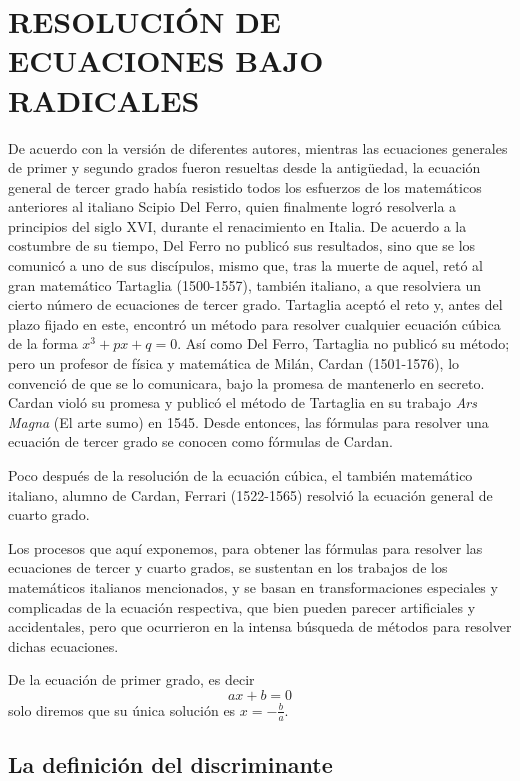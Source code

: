 \chapter[RESOLUCIÓN DE ECUACIONES BAJO RADICALES]{RESOLUCIÓN DE \\ ECUACIONES BAJO \\ RADICALES}\label{sec:radical}

De acuerdo con la versión de diferentes autores, mientras las ecuaciones generales de primer y segundo grados fueron resueltas desde la antigüedad, la ecuación general de tercer grado había resistido todos los esfuerzos de los matemáticos anteriores al italiano Scipio Del Ferro, quien finalmente logró resolverla a principios del siglo XVI, durante el renacimiento en Italia. De acuerdo a la costumbre de su tiempo, Del Ferro no publicó sus resultados, sino que se los comunicó a uno de sus discípulos, mismo que, tras la muerte de aquel, retó al gran matemático Tartaglia (1500-1557), también italiano, a que resolviera un cierto número de ecuaciones de tercer grado. Tartaglia aceptó el reto y, antes del plazo fijado en este, encontró un método para resolver cualquier ecuación cúbica de la forma \( x^3 + px + q = 0 \). Así como Del Ferro, Tartaglia no publicó su método; pero un profesor de física y matemática de Milán, Cardan (1501-1576), lo convenció de que se lo comunicara, bajo la promesa de mantenerlo en secreto. Cardan violó su promesa y publicó el método de Tartaglia en su trabajo \textit{Ars Magna} (El arte sumo) en 1545. Desde entonces, las fórmulas para resolver una ecuación de tercer grado se conocen como fórmulas de Cardan.

Poco después de la resolución de la ecuación cúbica, el también matemático italiano, alumno de Cardan, Ferrari (1522-1565) resolvió la ecuación general de cuarto grado.

Los procesos que aquí exponemos, para obtener las fórmulas para resolver las ecuaciones de tercer y cuarto grados, se sustentan en los trabajos de los matemáticos italianos mencionados, y se basan en transformaciones especiales y complicadas de la ecuación respectiva, que bien pueden parecer artificiales y accidentales, pero que ocurrieron en la intensa búsqueda de métodos para resolver dichas ecuaciones.


De la ecuación de primer grado, es decir
$$ax+b=0$$
solo diremos que su única solución es $\displaystyle x = -\frac{b}{a}$.

\section{La definición del discriminante}

